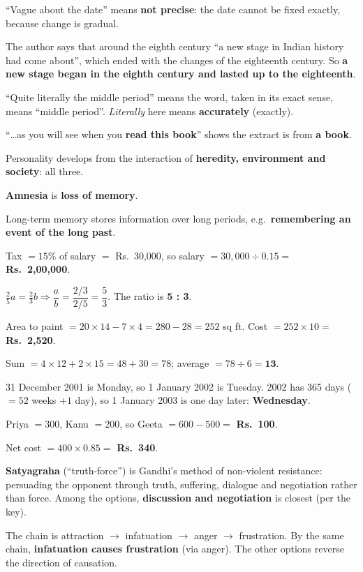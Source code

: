 ``Vague about the date'' means \textbf{not precise}: the date cannot be fixed exactly, because change is gradual.

The author says that around the eighth century ``a new stage in Indian history had come about'', which ended with the changes of the eighteenth century. So \textbf{a new stage began in the eighth century and lasted up to the eighteenth}.

``Quite literally the middle period'' means the word, taken in its exact sense, means ``middle period''. \emph{Literally} here means \textbf{accurately} (exactly).

``\ldots as you will see when you \textbf{read this book}'' shows the extract is from \textbf{a book}.

Personality develops from the interaction of \textbf{heredity, environment and society}: all three.

\textbf{Amnesia} is \textbf{loss of memory}.

Long-term memory stores information over long periods, e.g.\ \textbf{remembering an event of the long past}.

Tax $=15\%$ of salary $=$ Rs.~30,000, so salary $=30{,}000\div0.15=$ \textbf{Rs.~2,00,000}.

$\tfrac25a=\tfrac23b\Rightarrow\dfrac ab=\dfrac{2/3}{2/5}=\dfrac53$. The ratio is \textbf{5 : 3}.

Area to paint $=20\times14-7\times4=280-28=252$ sq ft. Cost $=252\times10=$ \textbf{Rs.~2,520}.

Sum $=4\times12+2\times15=48+30=78$; average $=78\div6=\mathbf{13}$.

31 December 2001 is Monday, so 1 January 2002 is Tuesday. 2002 has 365 days ($=52$ weeks $+1$ day), so 1 January 2003 is one day later: \textbf{Wednesday}.

Priya $=300$, Kanu $=200$, so Geeta $=600-500=$ \textbf{Rs.~100}.

Net cost $=400\times0.85=$ \textbf{Rs.~340}.

\textbf{Satyagraha} (``truth-force'') is Gandhi's method of non-violent resistance: persuading the opponent through truth, suffering, dialogue and negotiation rather than force. Among the options, \textbf{discussion and negotiation} is closest (per the key).

The chain is attraction $\rightarrow$ infatuation $\rightarrow$ anger $\rightarrow$ frustration. By the same chain, \textbf{infatuation causes frustration} (via anger). The other options reverse the direction of causation.

